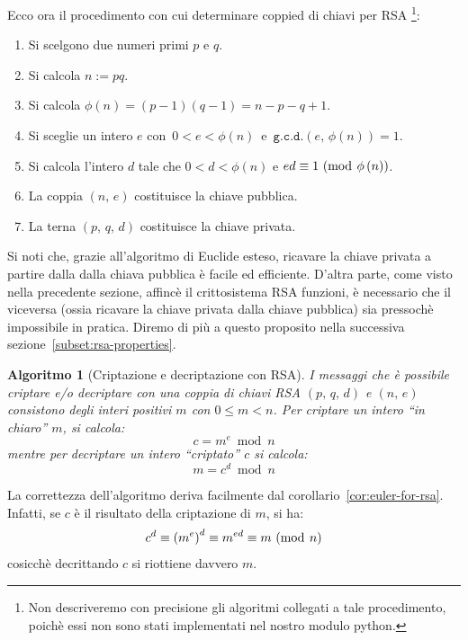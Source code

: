 \documentclass[pdflatex,11pt,a4paper,oneside]{article}
\let\OldEmph\emph
\renewcommand{\emph}[1]{\OldEmph{#1\/}}
\newcommand{\p}[1]{\left({#1}\right)}
\newcommand{\ephi}[1]{\ensuremath{\phi\p{#1}}}
\newcommand{\congruent}[0]{\equiv}
\newcommand{\mmodop}[0]{\ensuremath{\operatorname{mod}}}
\newcommand{\mmod}[1]{\ensuremath{\allowbreak\ (\mmodop\:{#1})}}
\newcommand{\rem}[2]{\ensuremath{{#1}\:\mmodop\:{#2}}}
\newcommand{\gcdop}[0]{\ensuremath{\mathtt{g.c.d.}}}
\newcommand{\xgcd}[1]{\ensuremath{\gcdop\left({#1}\right)}}
\renewcommand{\gcd}[2]{\xgcd{{#1},\,{#2}}}
\newtheorem{algorithm}[TheoremLike]{Algoritmo}
\begin{document}
\smallskip\noindent
Ecco ora il procedimento con cui determinare coppied di chiavi per RSA%
\footnote{Non descriveremo con precisione gli algoritmi collegati a tale
procedimento, poich\`e essi non sono stati implementati nel nostro modulo
python.}:
\begin{enumerate}\label{enum:rsa-keys}
 \item Si scelgono due numeri primi $p$ e $q$.
 \item Si calcola $n := pq$.
 \item Si calcola $\ephi{n} =  (p - 1) (q - 1) = n - p - q + 1$.
 \item Si sceglie un intero $e$ con \,$0 < e < \ephi{n}$\, e\,
       $\gcd{e}{\ephi{n}} = 1$.
 \item Si calcola l'intero $d$ tale che $0 < d < \ephi{n}$ e
       $ed \congruent 1 \mmod {\ephi{n}}$.
 \item La coppia $(n,\,e)$ costituisce la chiave pubblica.
 \item La terna $(p,\,q,\,d)$ costituisce la chiave privata.
\end{enumerate}

Si noti che, grazie all'algoritmo di Euclide esteso, ricavare la
chiave privata a partire dalla dalla chiava pubblica \`e facile ed
efficiente. D'altra parte, come visto nella precedente sezione,
affinc\`e il crittosistema RSA funzioni, \`e necessario che il
viceversa (ossia ricavare la chiave privata dalla chiave pubblica)
sia pressoch\`e impossibile in pratica. Diremo di pi\`u a questo
proposito nella successiva sezione~\eqref{subset:rsa-properties}.

\begin{algorithm}[Criptazione e decriptazione con RSA]
I messaggi che \`e possibile criptare e/o decriptare con una coppia
di chiavi RSA $(p,\,q,\,d)$ e $(n,\,e)$ consistono degli interi positivi
$m$ con $0 \leq m < n$. Per \emph{criptare} un intero ``in chiaro'' $m$,
si calcola:
\begin{equation}\label{eq:rsa-crypt}
  c = \rem{m^e}{n}
\end{equation}
mentre per \emph{decriptare} un intero ``criptato'' $c$ si calcola:
\begin{equation}\label{eq:rsa-decrypt}
  m = \rem{c^d}{n}
\end{equation}
\end{algorithm}

La correttezza dell'algoritmo deriva facilmente dal
corollario~\eqref{cor:euler-for-rsa}.  Infatti, se $c$ \`e il
risultato della criptazione di $m$, si ha:
  $$c^d \congruent {\p{m^e}}^d \congruent m^{ed} \congruent m \mmod n$$
cosicch\`e decrittando $c$ si riottiene davvero $m$.
\end{document}
